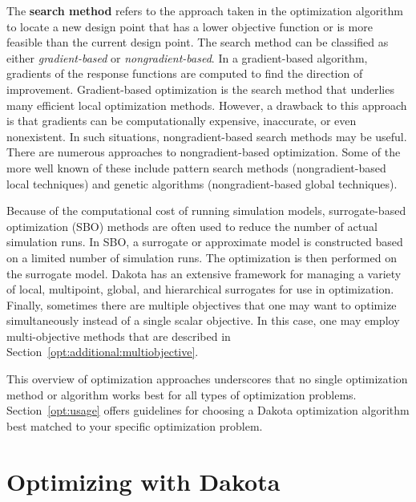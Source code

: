 The {\bf search method} refers to the approach taken in the
optimization algorithm to locate a new design point that has a lower
objective function or is more feasible than the current design point.
The search method can be classified as either \emph{gradient-based} or
\emph{nongradient-based}. In a gradient-based algorithm, gradients of
the response functions are computed to find the direction of
improvement. Gradient-based optimization is the search method that
underlies many efficient local optimization methods. However, a
drawback to this approach is that gradients can be computationally
expensive, inaccurate, or even nonexistent. In such situations,
nongradient-based search methods may be useful. There are numerous
approaches to nongradient-based optimization. Some of the more well
known of these include pattern search methods (nongradient-based local
techniques) and genetic algorithms (nongradient-based global
techniques). 

Because of the computational cost of running simulation
models, surrogate-based optimization (SBO) methods are often used to
reduce the number of actual simulation runs. In SBO, a surrogate or
approximate model is constructed based on a limited number of
simulation runs. The optimization is then performed on the surrogate
model. Dakota has an extensive framework for managing a variety of
local, multipoint, global, and hierarchical surrogates for use in
optimization. Finally, sometimes there are multiple objectives that 
one may want to optimize simultaneously instead of a single scalar 
objective.  In this case, one may employ multi-objective methods 
that are described in Section~\ref{opt:additional:multiobjective}.

This overview of optimization approaches underscores that no single
optimization method or algorithm works best for all types of
optimization problems. Section~\ref{opt:usage} offers guidelines for
choosing a Dakota optimization algorithm best matched to your specific
optimization problem.

\section{Optimizing with Dakota}\label{opt:dakota}

